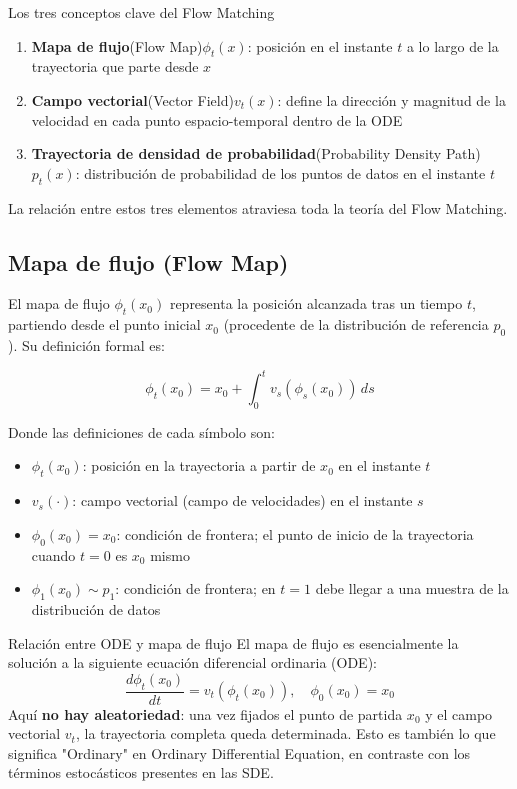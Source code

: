 \documentclass[a4paper]{article}
\begin{document}
\begin{importantbox}{Los tres conceptos clave del Flow Matching}
\begin{enumerate}
    \item \textbf{Mapa de flujo}(Flow Map)$\phi_t(x)$: posición en el instante $t$ a lo largo de la trayectoria que parte desde $x$
    \item \textbf{Campo vectorial}(Vector Field)$v_t(x)$: define la dirección y magnitud de la velocidad en cada punto espacio-temporal dentro de la ODE
    \item \textbf{Trayectoria de densidad de probabilidad}(Probability Density Path)$p_t(x)$: distribución de probabilidad de los puntos de datos en el instante $t$
\end{enumerate}
La relación entre estos tres elementos atraviesa toda la teoría del Flow Matching.
\end{importantbox}

\subsection{Mapa de flujo (Flow Map)}

El mapa de flujo $\phi_t(x_0)$ representa la posición alcanzada tras un tiempo $t$, partiendo desde el punto inicial $x_0$ (procedente de la distribución de referencia $p_0$). Su definición formal es:

$$\phi_t(x_0) = x_0 + \int_0^t v_s(\phi_s(x_0)) \, ds$$

Donde las definiciones de cada símbolo son:
\begin{itemize}
    \item $\phi_t(x_0)$: posición en la trayectoria a partir de $x_0$ en el instante $t$
    \item $v_s(\cdot)$: campo vectorial (campo de velocidades) en el instante $s$
    \item $\phi_0(x_0) = x_0$: condición de frontera; el punto de inicio de la trayectoria cuando $t=0$ es $x_0$ mismo
    \item $\phi_1(x_0) \sim p_1$: condición de frontera; en $t=1$ debe llegar a una muestra de la distribución de datos
\end{itemize}

\begin{knowledgebox}{Relación entre ODE y mapa de flujo}
El mapa de flujo es esencialmente la solución a la siguiente ecuación diferencial ordinaria (ODE):
$$\frac{d\phi_t(x_0)}{dt} = v_t(\phi_t(x_0)), \quad \phi_0(x_0) = x_0$$
Aquí \textbf{no hay aleatoriedad}: una vez fijados el punto de partida $x_0$ y el campo vectorial $v_t$, la trayectoria completa queda determinada. Esto es también lo que significa "Ordinary" en Ordinary Differential Equation, en contraste con los términos estocásticos presentes en las SDE.
\end{knowledgebox}
\end{document}
